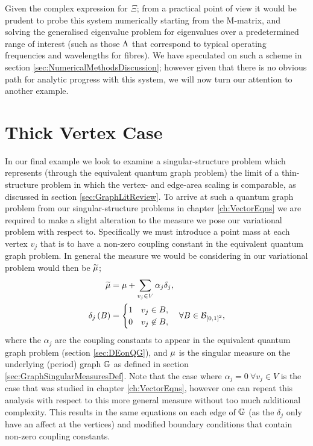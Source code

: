 Given the complex expression for $\Xi$; from a practical point of view it would be prudent to probe this system numerically starting from the M-matrix, and solving the generalised eigenvalue problem for eigenvalues over a predetermined range of interest (such as those $\Lambda$ that correspond to typical operating frequencies and wavelengths for fibres).
We have speculated on such a scheme in section \ref{sec:NumericalMethodsDiscussion}; however given that there is no obvious path for analytic progress with this system, we will now turn our attention to another example.

\section{Thick Vertex Case} \label{sec:ExampleThickVertex}
In our final example we look to examine a singular-structure problem which represents (through the equivalent quantum graph problem) the limit of a thin-structure problem in which the vertex- and edge-area scaling is comparable, as discussed in section \ref{sec:GraphLitReview}.
To arrive at such a quantum graph problem from our singular-structure problems in chapter \ref{ch:VectorEqns} we are required to make a slight alteration to the measure we pose our variational problem with respect to.
Specifically we must introduce a point mass at each vertex $v_j$ that is to have a non-zero coupling constant in the equivalent quantum graph problem. 
In general the measure we would be considering in our variational problem would then be $\widetilde{\mu}$;
\begin{align*}
	\widetilde{\mu} &= \mu + \sum_{v_j\in V}\alpha_j \delta_{j}, \\
	\delta_{j}\left( B \right) &= \begin{cases} 1 & v_j\in B, \\ 0 & v_j\not\in B, \end{cases} \quad\forall B\in\mathcal{B}_{\left[ 0,1 \right]^2},
\end{align*}
where the $\alpha_j$ are the coupling constants to appear in the equivalent quantum graph problem (section \ref{sec:DEonQG}), and $\mu$ is the singular measure on the underlying (period) graph $\mathbb{G}$ as defined in section \ref{sec:GraphSingularMeasuresDef}.
Note that the case where $\alpha_j=0 \ \forall v_j\in V$ is the case that was studied in chapter \ref{ch:VectorEqns}, however one can repeat this analysis with respect to this more general measure without too much additional complexity.
This results in the same equations on each edge of $\mathbb{G}$ (as the $\delta_j$ only have an affect at the vertices) and modified boundary conditions that contain non-zero coupling constants. \newline

